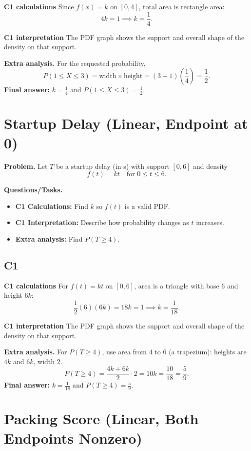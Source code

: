 \textbf{C1 calculations}
Since $f(x)=k$ on $[0,4]$, total area is rectangle area:
	\[
	4k=1\implies k=\frac14.
	\]

\textbf{C1 interpretation}
The PDF graph shows the support and overall shape of the density on that support.

\textbf{Extra analysis.}
For the requested probability,
\[
P(1\le X\le3)=\text{width}\times\text{height}=(3-1)\left(\frac14\right)=\frac12.
\]
\textbf{Final answer:} $k=\frac14$ and $P(1\le X\le3)=\frac12$.
	\section{Startup Delay (Linear, Endpoint at 0)}
	
	\textbf{Problem.}
	Let $T$ be a startup delay (in s) with support $[0,6]$ and density
	\[
	f(t)=kt\quad\text{for }0\le t\le 6.
	\]
	
	\textbf{Questions/Tasks.}
	\begin{itemize}
		\item \textbf{C1 Calculations:} Find $k$ so $f(t)$ is a valid PDF.
		\item \textbf{C1 Interpretation:} Describe how probability changes as $t$ increases.
		\item \textbf{Extra analysis:} Find $P(T\ge 4)$.
	\end{itemize}

	\subsection*{C1}

\textbf{C1 calculations}
For $f(t)=kt$ on $[0,6]$, area is a triangle with base $6$ and height $6k$:
	\[
	\frac12(6)(6k)=18k=1\implies k=\frac1{18}.
	\]

\textbf{C1 interpretation}
The PDF graph shows the support and overall shape of the density on that support.

\textbf{Extra analysis.}
For $P(T\ge4)$, use area from $4$ to $6$ (a trapezium): heights are $4k$ and $6k$, width $2$.
\[
P(T\ge4)=\frac{4k+6k}{2}\cdot2=10k=\frac{10}{18}=\frac59.
\]
\textbf{Final answer:} $k=\frac1{18}$ and $P(T\ge4)=\frac59$.

\section{Packing Score (Linear, Both Endpoints Nonzero)}

